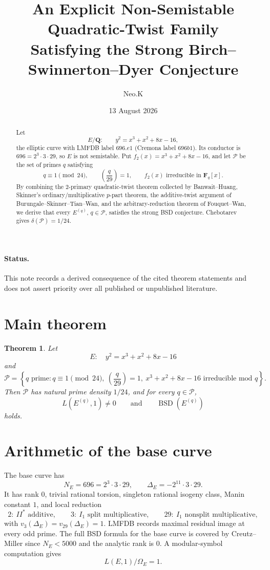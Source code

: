 \documentclass[11pt]{article}
\title{An Explicit Non-Semistable Quadratic-Twist Family\\
Satisfying the Strong Birch--Swinnerton--Dyer Conjecture}
\author{Neo.K}
\date{13 August 2026}
\newtheorem{theorem}{Theorem}[section]
\newcommand{\Q}{\mathbf Q}
\newcommand{\F}{\mathbf F}
\newcommand{\BSD}{\operatorname{BSD}}
\begin{document}
\maketitle

\begin{abstract}
Let
\[
E/\Q:\qquad y^2=x^3+x^2+8x-16,
\]
the elliptic curve with LMFDB label \(696.e1\) (Cremona label \(696b1\)).
Its conductor is \(696=2^3\cdot3\cdot29\), so \(E\) is not semistable.
Put \(f_2(x)=x^3+x^2+8x-16\), and let \(\mathcal P\) be the set of primes
\(q\) satisfying
\[
q\equiv1\pmod{24},\qquad
\left(\frac q{29}\right)=1,\qquad
f_2(x)\text{ irreducible in }\F_q[x].
\]
By combining the \(2\)-primary quadratic-twist theorem collected by
Banwait--Huang, Skinner's ordinary/multiplicative \(p\)-part theorem, the
additive-twist argument of Burungale--Skinner--Tian--Wan, and the
arbitrary-reduction theorem of Fouquet--Wan, we derive that every
\(E^{(q)}\), \(q\in\mathcal P\), satisfies the strong BSD conjecture.
Chebotarev gives \(\delta(\mathcal P)=1/24\).
\end{abstract}

\paragraph{Status.}
This note records a derived consequence of the cited theorem statements and
does not assert priority over all published or unpublished literature.

\section{Main theorem}

\begin{theorem}\label{thm:main}
Let
\[
E:\quad y^2=x^3+x^2+8x-16
\]
and
\[
\mathcal P=\left\{
q\text{ prime}:q\equiv1\pmod{24},\
\left(\frac q{29}\right)=1,\
x^3+x^2+8x-16\text{ irreducible mod }q
\right\}.
\]
Then \(\mathcal P\) has natural prime density \(1/24\), and for every
\(q\in\mathcal P\),
\[
L(E^{(q)},1)\ne0
\qquad\text{and}\qquad
\BSD(E^{(q)})
\]
holds.
\end{theorem}

\section{Arithmetic of the base curve}

The base curve has
\[
N_E=696=2^3\cdot3\cdot29,\qquad
\Delta_E=-2^{11}\cdot3\cdot29.
\]
It has rank \(0\), trivial rational torsion, singleton rational isogeny
class, Manin constant \(1\), and local reduction
\[
2:\ II^*\text{ additive},\qquad
3:\ I_1\text{ split multiplicative},\qquad
29:\ I_1\text{ nonsplit multiplicative},
\]
with \(v_3(\Delta_E)=v_{29}(\Delta_E)=1\).
LMFDB records maximal residual image at every odd prime.  The full BSD
formula for the base curve is covered by Creutz--Miller since
\(N_E<5000\) and the analytic rank is \(0\).
A modular-symbol computation gives
\[
L(E,1)/\Omega_E=1.
\]
\end{document}
